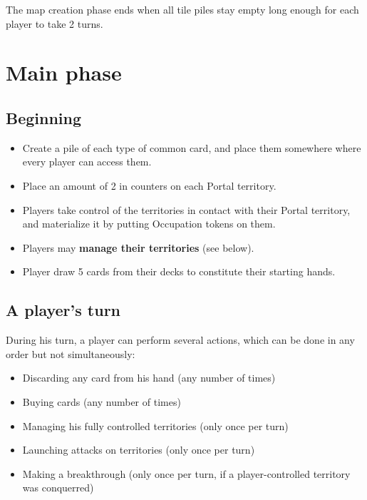 \documentclass[a4paper]{article}
\begin{document}
    The map creation phase ends when all tile piles stay empty long enough for each
    player to take 2 turns.


\newpage
\section{Main phase}

  \subsection{Beginning}
  
  	\begin{itemize}
        \item Create a pile of each type of common card,
            and place them somewhere where every player can access them.
        \item Place an amount of 2 in counters on each Portal territory.
        \item Players take control of the territories in contact with their Portal
        territory, and materialize it by putting Occupation tokens on them.
        \item Players may \textbf{manage their territories} (see below).
        \item Player draw 5 cards from their decks to constitute their starting hands.
    \end{itemize}


  \subsection{A player's turn}

    \hspace{-2em} During his turn, a player can perform several actions,
    which can be done in any order but not simultaneously:
    \vspace{-1.3em}
    \begin{itemize}
        \item Discarding any card from his hand (any number of times)
        \item Buying cards (any number of times)
        \item Managing his fully controlled territories (only once per turn)
        \item Launching attacks on territories (only once per turn)
        \item Making a breakthrough (only once per turn,
        if a player-controlled territory was conquerred)
    \end{itemize}
    
\end{document}
